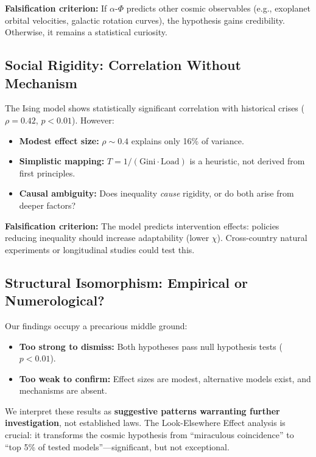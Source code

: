 \documentclass[11pt,twocolumn]{article}
\newcommand{\Gini}{\text{Gini}}
\begin{document}
\textbf{Falsification criterion:} If $\alpha$-$\Phi$ predicts other cosmic observables (e.g., exoplanet orbital velocities, galactic rotation curves), the hypothesis gains credibility. Otherwise, it remains a statistical curiosity.

\subsection{Social Rigidity: Correlation Without Mechanism}

The Ising model shows statistically significant correlation with historical crises ($\rho = 0.42$, $p < 0.01$). However:
\begin{itemize}
    \item \textbf{Modest effect size:} $\rho \sim 0.4$ explains only 16\% of variance.
    \item \textbf{Simplistic mapping:} $T = 1/(\Gini \cdot \text{Load})$ is a heuristic, not derived from first principles.
    \item \textbf{Causal ambiguity:} Does inequality \textit{cause} rigidity, or do both arise from deeper factors?
\end{itemize}

\textbf{Falsification criterion:} The model predicts intervention effects: policies reducing inequality should increase adaptability (lower $\chi$). Cross-country natural experiments or longitudinal studies could test this.

\subsection{Structural Isomorphism: Empirical or Numerological?}

Our findings occupy a precarious middle ground:
\begin{itemize}
    \item \textbf{Too strong to dismiss:} Both hypotheses pass null hypothesis tests ($p < 0.01$).
    \item \textbf{Too weak to confirm:} Effect sizes are modest, alternative models exist, and mechanisms are absent.
\end{itemize}

We interpret these results as \textbf{suggestive patterns warranting further investigation}, not established laws. The Look-Elsewhere Effect analysis is crucial: it transforms the cosmic hypothesis from ``miraculous coincidence'' to ``top 5\% of tested models''---significant, but not exceptional.
\end{document}
